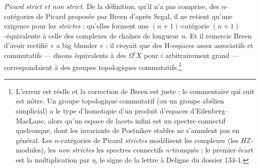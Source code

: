 \documentclass[11pt,a4paper]{article}
\begin{document}
\emph{Picard strict et non strict.} De la définition, qu'il n'a pas
comprise, des $n$-catégories de Picard proposée par Breen d'après Segal, il
ne retient qu'une exigence pour les \emph{strictes} : qu'elles forment une
$(n+1)$-catégorie $(n+1)$-équivalente à celle des complexes de chaînes de
longueur $n$. Et il remercie Breen d'avoir rectifié « a big blunder » : il
croyait que des H-espaces assez associatifs et commutatifs --- disons
équivalents à des $\Omega^iX$ pour $i$ arbitrairement grand ---
correspondaient à des groupes topologiques commutatifs.\footnote{L'erreur est
réelle et la correction de Breen est juste ; le commentaire qui suit est
nôtre. Un groupe topologique commutatif (ou un groupe abélien simplicial) a
le type d'homotopie d'un produit d'espaces d'Eilenberg--MacLane, alors
qu'un espace de lacets infini est un spectre connectif quelconque, dont les
invariants de Postnikov stables ne s'annulent pas en général. Les
$n$-catégories de Picard \emph{strictes} modélisent les complexes (les
$H\mathbb{Z}$-modules), les \emph{non strictes} les spectres connectifs
$n$-tronqués ; le premier écart est la multiplication par $\eta$, le signe
de la lettre à Deligne du dossier 134-1.}
\end{document}
